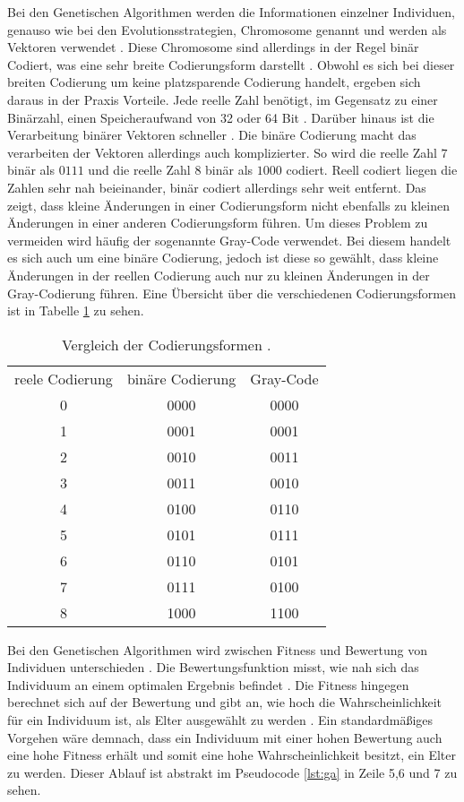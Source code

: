 Bei den Genetischen Algorithmen werden die Informationen einzelner Individuen, genauso wie bei den Evolutionsstrategien, Chromosome genannt und werden als Vektoren verwendet \cite[S. 187-189]{schoeneburg}. Diese Chromosome sind allerdings in der Regel binär Codiert, was eine sehr breite Codierungsform darstellt \cite[S. 191]{schoeneburg}. 
Obwohl es sich bei dieser breiten Codierung um keine platzsparende Codierung handelt, ergeben sich daraus in der Praxis Vorteile. Jede reelle Zahl benötigt, im Gegensatz zu einer Binärzahl, einen Speicheraufwand von 32 oder 64 Bit \cite[S. 191]{schoeneburg}.
Darüber hinaus ist die Verarbeitung binärer Vektoren schneller \cite[S. 191]{schoeneburg}. Die binäre Codierung macht das verarbeiten der Vektoren allerdings auch komplizierter.
So wird die reelle Zahl $7$ binär als $0111$ und die reelle Zahl $8$ binär als $1000$ codiert. Reell codiert liegen die Zahlen sehr nah beieinander, binär codiert allerdings sehr weit entfernt. Das zeigt, dass kleine Änderungen in einer Codierungsform nicht ebenfalls zu kleinen Änderungen in einer anderen Codierungsform führen.
Um dieses Problem zu vermeiden wird häufig der sogenannte Gray-Code verwendet. Bei diesem handelt es sich auch um eine binäre Codierung, jedoch ist diese so gewählt, dass kleine Änderungen in der reellen Codierung auch nur zu kleinen Änderungen in der Gray-Codierung führen. Eine Übersicht über die verschiedenen Codierungsformen ist in Tabelle \ref{tab:codierung} zu sehen.
\begin{table}[!htb]
\centering
\begin{tabular}[h]{c|c|c}
reele Codierung & binäre Codierung & Gray-Code \\
0 & 0000 & 0000 \\
1 & 0001 & 0001 \\
2 & 0010 & 0011 \\
3 & 0011 & 0010 \\
4 & 0100 & 0110 \\
5 & 0101 & 0111 \\
6 & 0110 & 0101 \\
7 & 0111 & 0100 \\
8 & 1000 & 1100 \\
\end{tabular}
\caption{\label{tab:codierung}Vergleich der Codierungsformen \cite[S. 192]{schoeneburg}.}
\end{table}

Bei den Genetischen Algorithmen wird zwischen Fitness und Bewertung von Individuen unterschieden \cite[S. 196]{schoeneburg}. Die Bewertungsfunktion misst, wie nah sich das Individuum an einem optimalen Ergebnis befindet \cite[S. 196]{schoeneburg}.
Die Fitness hingegen berechnet sich auf der Bewertung und gibt an, wie hoch die Wahrscheinlichkeit für ein Individuum ist, als Elter ausgewählt zu werden \cite[S. 196]{schoeneburg}. Ein standardmäßiges Vorgehen wäre demnach, dass ein Individuum mit einer hohen Bewertung auch eine hohe Fitness erhält und somit eine hohe Wahrscheinlichkeit besitzt, ein Elter zu werden.
Dieser Ablauf ist abstrakt im Pseudocode \ref{lst:ga} in Zeile 5,6 und 7 zu sehen.

